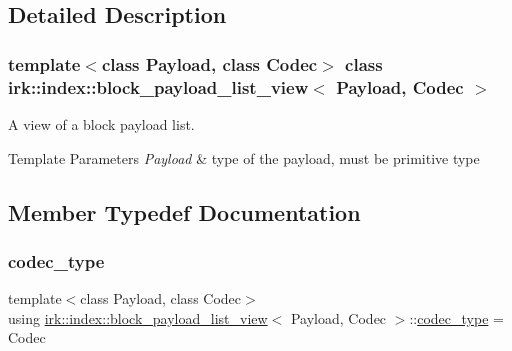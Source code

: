 \subsection{Detailed Description}
\subsubsection*{template$<$class Payload, class Codec$>$\newline
class irk\+::index\+::block\+\_\+payload\+\_\+list\+\_\+view$<$ Payload, Codec $>$}

A view of a block payload list. 


\begin{DoxyTemplParams}{Template Parameters}
{\em Payload} & type of the payload, must be primitive type \\
\hline
\end{DoxyTemplParams}


\subsection{Member Typedef Documentation}
\mbox{\label{classirk_1_1index_1_1block__payload__list__view_a2f176f6aaee1081eb5c64e5397dab6b2}} 
\subsubsection{\texorpdfstring{codec\+\_\+type}{codec\_type}}
{\footnotesize\ttfamily template$<$class Payload, class Codec$>$ \\
using \mbox{\hyperlink{classirk_1_1index_1_1block__payload__list__view}{irk\+::index\+::block\+\_\+payload\+\_\+list\+\_\+view}}$<$ Payload, Codec $>$\+::\mbox{\hyperlink{classirk_1_1index_1_1block__payload__list__view_a2f176f6aaee1081eb5c64e5397dab6b2}{codec\+\_\+type}} =  Codec}

\mbox{\label{classirk_1_1index_1_1block__payload__list__view_a201e879cc73a3fd9476a2e1043f4d74d}} 
